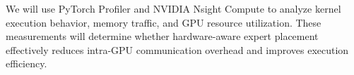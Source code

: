 \documentclass{article} %
\begin{document}
We will use PyTorch Profiler and NVIDIA Nsight Compute to analyze kernel execution behavior, memory traffic, and GPU resource utilization. These measurements will determine whether hardware-aware expert placement effectively reduces intra-GPU communication overhead and improves execution efficiency.

\nocite{*}


\end{document}
